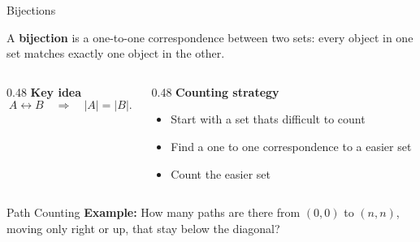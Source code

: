 \begin{frame}{Bijections}
  \begin{sqt:definition}
    A \textbf{bijection} is a one-to-one correspondence between two sets:
    every object in one set matches exactly one object in the other.
  \end{sqt:definition}

  \vspace{0.4em}

  \begin{columns}[T]
    \begin{column}{0.48\textwidth}
      \textbf{Key idea}
      \[
        A \leftrightarrow B
        \quad \Longrightarrow \quad
        |A| = |B|.
      \]
    \end{column}

    \begin{column}{0.48\textwidth}
      \textbf{Counting strategy}
      \begin{itemize}
        \item Start with a set thats difficult to count
        \item Find a one to one correspondence to a easier set
        \item Count the easier set
      \end{itemize}
    \end{column}
  \end{columns}
\end{frame}


\begin{frame}{Path Counting}
  \textcolor{sqt-question}{
    \textbf{Example:}
    How many paths are there from \((0,0)\) to \((n,n)\),
    moving only right or up, that stay below the diagonal?
  }

  \vspace{0.8em}

  \begin{center}
  \end{center}
\end{frame}


